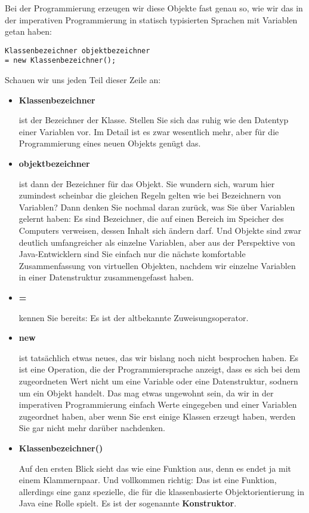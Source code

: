 Bei der Programmierung erzeugen wir diese Objekte fast genau so, wie wir das in der imperativen Programmierung in statisch typisierten Sprachen mit Variablen getan haben:

\begin{verbatim}
Klassenbezeichner objektbezeichner 
= new Klassenbezeichner();
\end{verbatim}

Schauen wir uns jeden Teil dieser Zeile an:

\begin{itemize}
	\item \textbf{Klassenbezeichner} 
	
	ist der Bezeichner der Klasse. Stellen Sie sich das ruhig wie den Datentyp einer Variablen vor. Im Detail ist es zwar wesentlich mehr, aber für die Programmierung eines neuen Objekts genügt das.
	\item \textbf{objektbezeichner} 
	
	ist dann der Bezeichner für das Objekt. Sie wundern sich, warum hier zumindest scheinbar die gleichen Regeln gelten wie bei Bezeichnern von Variablen? Dann denken Sie nochmal daran zurück, was Sie über Variablen gelernt haben: Es sind Bezeichner, die auf einen Bereich im Speicher des Computers verweisen, dessen Inhalt sich ändern darf. Und Objekte sind zwar deutlich umfangreicher als einzelne Variablen, aber aus der Perspektive von Java-Entwicklern sind Sie einfach nur die nächste komfortable Zusammenfassung von virtuellen Objekten, nachdem wir einzelne Variablen in einer Datenstruktur zusammengefasst haben.
	\item \textbf{=} 
	
	kennen Sie bereits: Es ist der altbekannte Zuweisungsoperator.
	\item \textbf{new} 
	
	ist tatsächlich etwas neues, das wir bislang noch nicht besprochen haben. Es ist eine Operation, die der \glqq{}Programmiersprache\grqq{} anzeigt, dass es sich bei dem zugeordneten Wert nicht um eine Variable oder eine Datenstruktur, sodnern um ein Objekt handelt. Das mag etwas ungewohnt sein, da wir in der imperativen Programmierung einfach Werte eingegeben und einer Variablen zugeordnet haben, aber wenn Sie erst einige Klassen erzeugt haben, werden Sie gar nicht mehr darüber nachdenken.
	
	\item \textbf{Klassenbezeichner()}
	
	Auf den ersten Blick sieht das wie eine Funktion aus, denn es endet ja mit einem Klammernpaar. Und vollkommen richtig: Das ist eine Funktion, allerdings eine ganz spezielle, die für die klassenbasierte Objektorientierung in Java eine Rolle spielt. Es ist der sogenannte \textbf{Konstruktor}.
	

\end{itemize}
